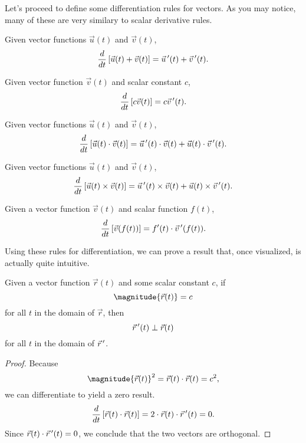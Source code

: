 Let's proceed to define some differentiation rules for vectors. As you may notice, many of these are very similary to scalar derivative rules.

\begin{proposition}
    Given vector functions $\vec{u}(t)$ and $\vec{v}(t)$,
    \[\frac{d}{dt}\left[\vec{u}(t) + \vec{v}(t)\right] = \vec{u}\,^{\prime}(t) + \vec{v}\,^{\prime}(t).\]
\end{proposition}

\begin{proposition}
    Given vector function $\vec{v}(t)$ and scalar constant $c$,
    \[\frac{d}{dt}\left[c\vec{v}(t)\right] = c\vec{v}\,^{\prime}(t).\]
\end{proposition}

\begin{proposition}
    Given vector functions $\vec{u}(t)$ and $\vec{v}(t)$,
    \[\frac{d}{dt}\left[\vec{u}(t) \cdot \vec{v}(t)\right] = \vec{u}\,^{\prime}(t) \cdot \vec{v}(t) + \vec{u}(t) \cdot \vec{v}\,^{\prime}(t).\]
\end{proposition}

\begin{proposition}
    Given vector functions $\vec{u}(t)$ and $\vec{v}(t)$,
    \[\frac{d}{dt}\left[\vec{u}(t) \times \vec{v}(t)\right] = \vec{u}\,^{\prime}(t) \times \vec{v}(t) + \vec{u}(t) \times \vec{v}\,^{\prime}(t).\]
\end{proposition}

\begin{proposition}
    Given a vector function $\vec{v}(t)$ and scalar function $f(t)$,
    \[\frac{d}{dt}\left[\vec{v}(f(t))\right] = f^{\prime}(t)\cdot \vec{v}\,^{\prime}(f(t)).\]
\end{proposition}

Using these rules for differentiation, we can prove a result that, once visualized, is actually quite intuitive.

\begin{theorem}
    Given a vector function $\vec{r}(t)$ and some scalar constant $c$, if
    \[\magnitude{\vec{r}(t)} = c\]
    for all $t$ in the domain of $\vec{r}$, then
    \[\vec{r}\,^{\prime}(t) \perp \vec{r}(t)\]
    for all $t$ in the domain of $\vec{r}\,^{\prime}$.
\end{theorem}

\begin{proof}
    Because
    \[\magnitude{\vec{r}(t)}^{2} = \vec{r}(t) \cdot \vec{r}(t) = c^{2},\]
    we can differentiate to yield a zero result.
    \[\frac{d}{dt}\left[\vec{r}(t) \cdot \vec{r}(t)\right] = 2 \cdot \vec{r}(t) \cdot \vec{r}\,^{\prime}(t) = 0.\]
    Since $\vec{r}(t) \cdot \vec{r}\,^{\prime}(t) = 0$, we conclude that the two vectors are orthogonal.
\end{proof}